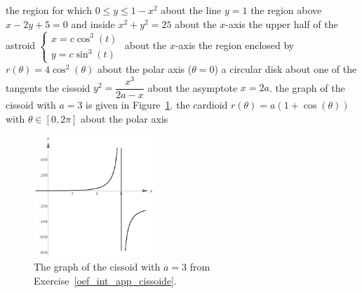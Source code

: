 \begin{Exercise}[label=oef_int_app_cissoide]
\ifanalysis
\ifanalysis\Question[difficulty = 2]\fi\ifcalculus\Question[difficulty = 3]\fi the region for which $0 \leq y \leq 1-x^2$ about the line $y=1$ 	
\Question[difficulty = 2] the region above $x - 2y + 5 = 0$ and inside $x^2 + y^2 = 25$ about the $x$-axis 
\Question[difficulty = 2] the upper half of the astroid $\left \{\begin{array}{l}
    x = c \cos^3 (t)\\
    y = c \sin^3 (t) 
    \end{array}\right. $
    about the $x$-axis 
\Question[difficulty = 3] the region enclosed by $r(\theta) = 4 \cos^2(\theta)$ about the polar axis ($\theta = 0$)    
\Question[difficulty = 3] a circular disk about one of the tangents  
\Question[difficulty = 3] the cissoid $ y^2 = \dfrac{x^3}{2a - x}$ about the asymptote $ x = 2a $. the graph of the cissoid with $a=3$ is given in Figure~\ref{fig_int_app_32_cissoide}. 
\Question[difficulty = 3] the cardioid $ r(\theta) = a (1 + \cos  (\theta))$ with $\theta \in [0,2\pi]$ about the polar axis
\begin{figure}[H]
	\begin{center}
			\includegraphics[width=0.4\textwidth]{fig_int_app_32}
	\caption{The graph of the cissoid with $a=3$ from Exercise~\ref{oef_int_app_cissoide}.}
	\label{fig_int_app_32_cissoide}
	\end{center}
\end{figure}
\fi


\end{Exercise}

